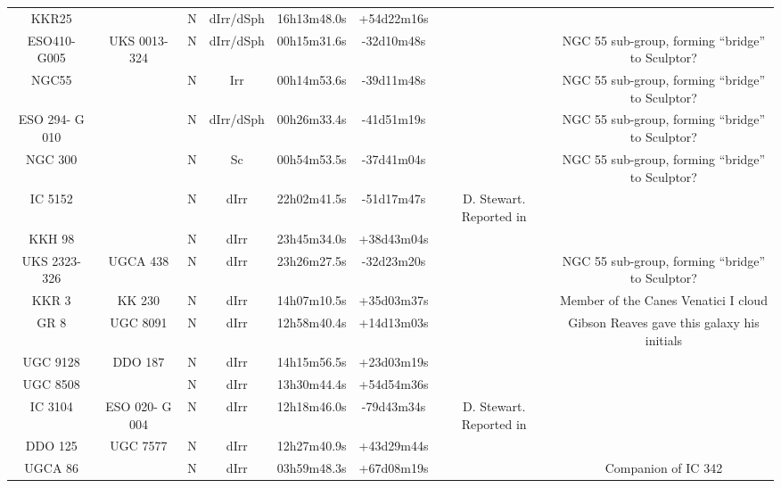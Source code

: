 \begin{table}
\begin{tabular}{cccccccc}
KKR25                &                          & N & dIrr/dSph& 16h13m48.0s & +54d22m16s &\cite{karachentsev2001a}&\\
ESO410-G005        & UKS 0013-324             & N & dIrr/dSph & 00h15m31.6s & -32d10m48s &\cite{lauberts1982} & NGC 55 sub-group, forming ``bridge'' to Sculptor?\\
NGC55                &                          & N & Irr & 00h14m53.6s & -39d11m48s &\cite{dunlop1828} & NGC 55 sub-group, forming ``bridge'' to Sculptor?\\
ESO 294- G 010        &                          & N &dIrr/dSph& 00h26m33.4s & -41d51m19s &\cite{lauberts1982}& NGC 55 sub-group, forming ``bridge'' to Sculptor?\\
NGC 300               &                          & N & Sc & 00h54m53.5s & -37d41m04s &\cite{dunlop1828}& NGC 55 sub-group, forming ``bridge'' to Sculptor?\\
IC 5152               &                          & N & dIrr & 22h02m41.5s & -51d17m47s &D. Stewart. Reported in \cite{pickering1899}&\\
KKH 98                &                          & N & dIrr & 23h45m34.0s & +38d43m04s &\cite{karachentsev2001b}&\\
UKS 2323-326          & UGCA 438                 & N & dIrr & 23h26m27.5s & -32d23m20s &\cite{longmore1978} &  NGC 55 sub-group, forming ``bridge'' to Sculptor?\\
KKR 3                 & KK 230                   & N & dIrr & 14h07m10.5s & +35d03m37s &\cite{karachentseva1998}\tablenotemark{h} & Member of the Canes Venatici I cloud\\
GR 8                  & UGC 8091                 & N & dIrr & 12h58m40.4s & +14d13m03s &\cite{reaves1956}\tablenotemark{i} &Gibson Reaves gave this galaxy his initials\\
UGC 9128              & DDO 187                  & N & dIrr & 14h15m56.5s & +23d03m19s &\cite{vandenbergh1959}&\\
UGC 8508              &                          & N & dIrr & 13h30m44.4s & +54d54m36s &\cite{vorontsovvelyaminov1962}&\\
IC 3104               & ESO 020- G 004           & N & dIrr & 12h18m46.0s & -79d43m34s &D. Stewart. Reported in \cite{pickering1908}&\\
DDO 125               & UGC 7577                 & N & dIrr & 12h27m40.9s & +43d29m44s &\cite{vandenbergh1959}&\\
UGCA 86               &                          & N & dIrr & 03h59m48.3s & +67d08m19s &\cite{nilson1974} & Companion of IC 342\\

\end{tabular}
\end{table}
